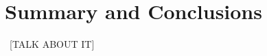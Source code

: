 \documentclass[aps,prb,twocolumn,superscriptaddress]{revtex4-1}
\begin{document}
	



\section{Summary and Conclusions}
~[TALK ABOUT IT]


\end{document}
